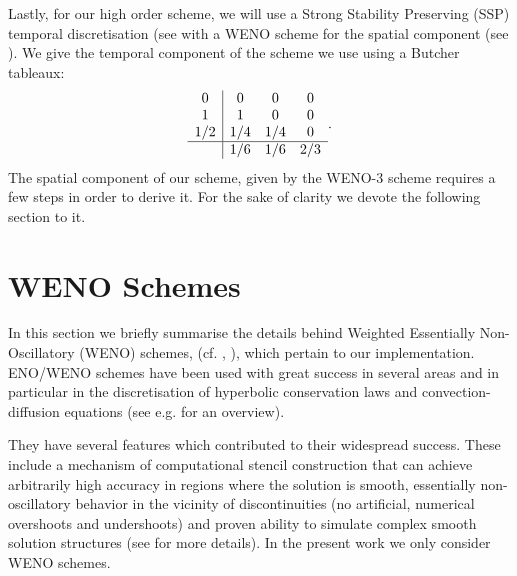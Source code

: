 \documentclass[final]{amsart}
\numberwithin{equation}{section}
\begin{document}
Lastly, for our high order scheme, we will use a Strong Stability Preserving (SSP) temporal discretisation  (see \cite{gottlieb2001strong} with a WENO scheme for the spatial component (see \cite{shu1988efficient}).
We give the temporal component of the scheme we use using a Butcher tableaux:
\begin{equation}\label{tbl:ssp3 _scheme}
  \begin{array}{c|ccc}0&0&0&0\\1&1&0&0\\1/2&1/4&1/4&0\\\hline &1/6&1/6&2/3\\\end{array}.
\end{equation}
The spatial component of our scheme,  given by the WENO-3 scheme requires a few steps in order to derive it.  For the sake of clarity we devote the following section to it.



\section{WENO Schemes}\label{sec:ENO_WENO_schemes}

In this section we briefly summarise the details behind Weighted
Essentially Non-Oscillatory (WENO) schemes,
(cf. \cite{jiang1996efficient}, \cite{shu1998essentially}), which
pertain to our implementation.  ENO/WENO schemes have been used with
great success in several areas and in particular in the discretisation
of hyperbolic conservation laws and convection-diffusion equations
(see e.g. \cite{shu2020essentially} for an overview).

They have several features which contributed to their widespread
success.  These include a mechanism of computational stencil
construction that can achieve arbitrarily high accuracy in regions
where the solution is smooth, essentially non-oscillatory behavior in
the vicinity of discontinuities (no artificial, numerical overshoots
and undershoots) and proven ability to simulate complex smooth
solution structures (see \cite{shu1998essentially} for more details).
In the present work we only consider WENO schemes.
\end{document}
